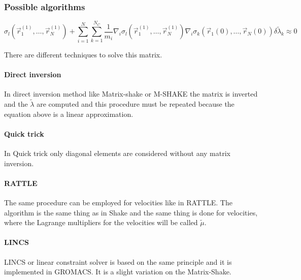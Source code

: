 		\subsubsection{Possible algorithms}

		$$\sigma_l(\vec{r}_1^{(1)}, \dots, \vec{r}_N^{(1)}) + \sum\limits_{i=1}^N\sum\limits_{k=1}^{N_C}\frac{1}{m_i}\nabla_i\sigma_l(\vec{r}_1^{(1)}, \dots, \vec{r}_N^{(1)})\nabla_i\sigma_k(\vec{r}_1(0), \dots, \vec{r}_N(0))\delta\tilde{\lambda}_k\approx 0$$

		There are different techniques to solve this matrix.

			\paragraph{Direct inversion}
			In direct inversion method like Matrix-shake or M-SHAKE the matrix is inverted and the $\tilde{\lambda}$ are computed and this procedure must be repeated because the equation above is a linear approximation.

			\paragraph{Quick trick}
			In Quick trick only diagonal elements are considered without any matrix inversion.

			\paragraph{RATTLE}
			The same procedure can be employed for velocities like in RATTLE.
			The algorithm is the same thing as in Shake and the same thing is done for velocities, where the Lagrange multipliers for the velocities will be called $\tilde{\mu}$.


			\paragraph{LINCS}
			LINCS or linear constraint solver is based on the same principle and it is implemented in GROMACS.
			It is a slight variation on the Matrix-Shake.
